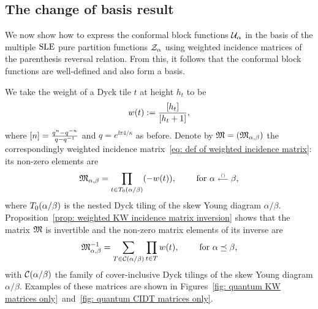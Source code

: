 \documentclass[oneside,english]{amsart}
\numberwithin{equation}{section}
\numberwithin{figure}{section}
\theoremstyle{plain}
\theoremstyle{plain}
\theoremstyle{plain}
\theoremstyle{remark}
\theoremstyle{plain}
\theoremstyle{plain}
\theoremstyle{plain}
\theoremstyle{plain}
\theoremstyle{plain}
\theoremstyle{plain}
\theoremstyle{plain}
\theoremstyle{plain}
\begin{document}
\subsection{The change of basis result}
\label{sub: change of basis results}

We now show how to express the conformal block functions $\mathcal{U}_\alpha$ in the basis of
the multiple $\mathrm{SLE}$ pure partition functions $\mathcal{Z}_\alpha$ using weighted incidence
matrices of the parenthesis reversal relation. From this, it follows that the conformal
block functions are well-defined and also form a basis.


We take the weight of a Dyck tile $t$ at height $h_t$ to be
\begin{align}\label{eq: weights in terms of q-numbers}
w(t) := \frac{\left[h_t\right]}{\left[h_t+1\right]} ,
\end{align}
where $\left[n\right] = \frac{q^n - q^{-n}}{q - q^{-1}}$ and $q = e^{\ii \pi 4/\kappa}$ as before.
Denote by $\mathfrak{M} = (\mathfrak{M}_{\alpha, \beta})$ the correspondingly weighted incidence 
matrix~\eqref{eq: def of weighted incidence matrix}: its non-zero elements are
\begin{align} \label{eq: M}
\mathfrak{M}_{\alpha, \beta} = \prod_{t \in T_0(\alpha / \beta)} (-w(t)) , \qquad \text{ for $\alpha \stackrel{\scriptscriptstyle{()}}{\scriptstyle{\longleftarrow}} \beta$,}
\end{align}
where $T_0(\alpha / \beta)$ is the nested Dyck tiling of the skew Young diagram 
$\alpha/\beta$.
Proposition~\ref{prop: weighted KW incidence matrix inversion} shows that the matrix 
$\mathfrak{M}$ is invertible and the non-zero matrix elements of its inverse are 
\begin{align}  \label{eq: Minv}
\mathfrak{M}^{-1}_{\alpha, \beta} = \sum_{T \in \mathcal{C} (\alpha/\beta)} \prod_{t \in T} w(t) , \qquad \text{ for $\alpha \preceq \beta$,}
\end{align}
with $\mathcal{C} (\alpha/\beta)$ the family of cover-inclusive Dyck tilings of 
the skew Young diagram $\alpha/\beta$.
Examples of these matrices are %
shown in Figures~\ref{fig: quantum KW matrices only}~and~\ref{fig: quantum CIDT matrices only}.
\end{document}
